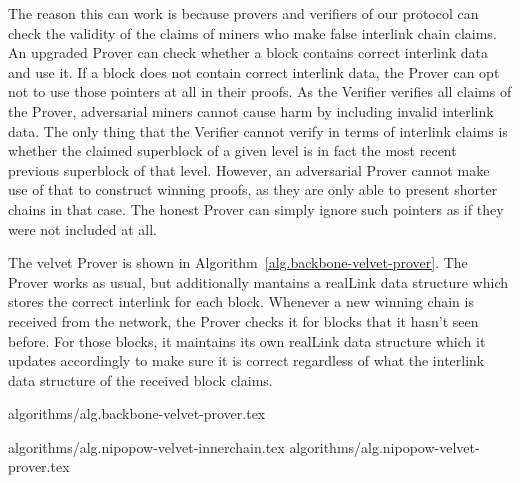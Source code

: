 The reason this can work is because provers and verifiers of our protocol can
check the validity of the claims of miners who make false interlink chain
claims. An upgraded Prover can check whether a block contains correct interlink
data and use it. If a block does not contain correct interlink data, the Prover
can opt not to use those pointers at all in their proofs. As the Verifier
verifies all claims of the Prover, adversarial miners cannot cause harm by
including invalid interlink data. The only thing that the Verifier cannot
verify in terms of interlink claims is whether the claimed superblock of a
given level is in fact the most recent previous superblock of that level.
However, an adversarial Prover cannot make use of that to construct winning
proofs, as they are only able to present shorter chains in that case. The
honest Prover can simply ignore such pointers as if they were not included at
all.

The velvet Prover is shown in Algorithm~\ref{alg.backbone-velvet-prover}. The
Prover works as usual, but additionally mantains a realLink data structure
which stores the correct interlink for each block. Whenever a new winning chain
is received from the network, the Prover checks it for blocks that it hasn't
seen before. For those blocks, it maintains its own realLink data structure
which it updates accordingly to make sure it is correct regardless of what the
interlink data structure of the received block claims.

{algorithms/alg.backbone-velvet-prover.tex}


{algorithms/alg.nipopow-velvet-innerchain.tex}
{algorithms/alg.nipopow-velvet-prover.tex}
